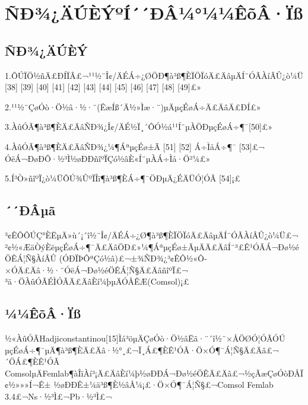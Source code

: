 \chapter{ÑÐ¾¿ÄÚÈÝºÍ´´ÐÂ¼°¼¼ÊõÂ·Ïß}

\section{ÑÐ¾¿ÄÚÈÝ}

1.ÔÚÏÖ½ñÄ£ÐÍÏÂ£¬¹¹½¨Î¢/ÄÉÁ÷¿ØÖÐ¶à³ß¶ÈÏÖÏóÄ£ÄâµÄÍ¨ÓÃÀíÂÛ¿ò¼Ü [38]
[39] [40] [41] [42] [43] [44] [45] [46] [47] [48] [49]£»

2.¹¹½¨ÇøÓò·Ö½â·½·¨(ÊæÍß´Ä½»Ìæ·¨)µÄµçÉøÁ÷Ä£ÄâÄ£ÐÍ£»

3.ÀûÓÃ¶à³ß¶ÈÄ£ÄâÑÐ¾¿Î¢/ÄÉ½Ï¸´ÔÓ½á¹¹Í¨µÀÖÐµçÉøÁ÷¶¯[50]£»

4.ÀûÓÃ¶à³ß¶ÈÄ£ÄâÑÐ¾¿¼¶ÁªµçÉø±Ã [51] [52] Á÷ÌåÁ÷¶¯ [53]£¬
ÓëÁ¬ÐøÐÔ·½³Ì½øÐÐñîºÏÇó½âÈ«Í¨µÀÁ÷Ìå·Ö²¼£»

5.Í³Ò»ñîºÏ¿ò¼ÜÔÚ¾ÛºÏÎï¶à³ß¶ÈÁ÷¶¯ÖÐµÄ¿ÉÄÜÓ¦ÓÃ [54]¡£

\section{´´ÐÂµã}

³¢ÊÔÔÚÇ°ÈËµÄ»ù´¡´î½¨Î¢/ÄÉÁ÷¿Ø¶à³ß¶ÈÏÖÏóÄ£ÄâµÄÍ¨ÓÃÀíÂÛ¿ò¼Ü£¬
²¢½«ÆäÒýÈëµçÉøÁ÷¶¯Ä£ÄâÖÐ£»¼¶ÁªµçÉø±ÃµÄÄ£ÄâÍ¨³£Ê¹ÓÃÁ¬Ðø½éÖÊÁ¦Ñ§ÀíÂÛ
(ÓÐÏÞÔªÇó½â)£¬±¾ÑÐ¾¿³¢ÊÔ½«Ô­×ÓÄ£Äâ·½·¨ÓëÁ¬Ðø½éÖÊÁ¦Ñ§Ä£ÄâñîºÏ£¬
³ä·ÖÀûÓÃÉÌÓÃÄ£ÄâÈí¼þµÄÓÅÊÆ(Comsol)¡£

\section{¼¼ÊõÂ·Ïß}

½«ÀûÓÃHadjiconstantinou[15]Ìá³öµÄÇøÓò·Ö½âËã·¨´î½¨×ÅÖØÓ¦ÓÃÓÚ
µçÉøÁ÷¶¯µÄ¶à³ß¶ÈÄ£Äâ·½°¸£¬Ï¸Á£¶ÈÊ¹ÓÃ·Ö×Ó¶¯Á¦Ñ§Ä£Äâ£¬´ÖÁ£¶ÈÊ¹ÓÃ
ComsolµÄFemlab¶àÎïÀí³¡Ä£ÄâÈí¼þ½øÐÐÁ¬Ðø½éÖÊÄ£Äâ£¬½çÃæÇøÓòÐÅÏ¢½»»»Í¬Ê±
½øÐÐÊ±¼ä³ß¶È½âÅ¼¡£·Ö×Ó¶¯Á¦Ñ§£¬Comsol Femlab 3.4£¬Ns·½³Ì£¬Pb·½³Ì£¬
